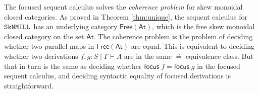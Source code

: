 \documentclass[copyright,creativecommons]{eptcs}
\theoremstyle{definition}
\newcommand{\SkNMILL}{$\mathtt{SkNMILL}$}
\newcommand{\FSkMCC}{\mathsf{Free}}
\begin{document}
The focused sequent calculus solves the \emph{coherence problem} for skew monoidal closed categories.
As proved in Theorem \ref{thm:unique}, the sequent calculus for \SkNMILL\ has an underlying category $\FSkMCC(\mathsf{At})$, which is the free skew monoidal closed category on the set $\mathsf{At}$. The coherence problem is the problem of deciding whether two parallel maps in $\FSkMCC(\mathsf{At})$ are equal. %
This is equivalent to deciding whether two derivations $f,g : S \mid \Gamma \vdash A$ are in the same $\circeq$-equivalence class. But that in turn is the same as deciding whether $\mathsf{focus}\;f = \mathsf{focus}\;g$ in the focused sequent calculus, and deciding syntactic equality of focused derivations is straightforward.


\end{document}
